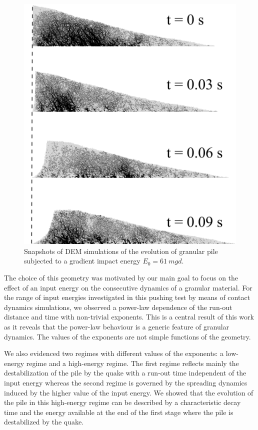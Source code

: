 \begin{figure}[tbph]
\centering
\includegraphics[width=\textwidth]{Uniform_Slope_DEM_200J}
\caption{Snapshots of DEM simulations of the evolution of granular pile 
subjected to a gradient impact energy $E_0 = 61 \ mgd$.}
\label{fig:Uniform_Slope_DEM_200J}
\end{figure}



The choice of this geometry was motivated by our main goal  to focus on the 
effect of an input energy on the consecutive dynamics of a granular material.
For the range of input energies investigated in this pushing test by means of 
contact dynamics simulations, we observed a power-law dependence of the 
run-out distance and time with non-trivial exponents. This is a central result 
of this work as it reveals that the power-law behaviour is a generic feature of 
granular dynamics. The values of the exponents are not simple functions of 
the geometry. 

We also evidenced two regimes with different values of the exponents: 
a low-energy regime and a high-energy regime. The first regime  
reflects mainly the destabilization of the pile by the quake with a run-out time 
independent of the input energy whereas the second regime is governed by the 
spreading dynamics induced by the higher value of the input energy. We showed 
that the evolution of the pile in this high-energy regime can be described by a 
characteristic decay time and the energy available at the end of the first 
stage where the pile is destabilized by the quake. 

